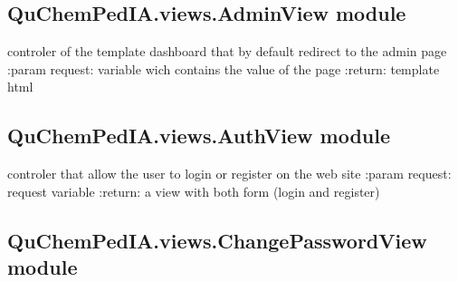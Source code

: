 \documentclass[letterpaper,10pt,english]{sphinxmanual}
\begin{document}
\subsection{QuChemPedIA.views.AdminView module}
\label{\detokenize{QuChemPedIA.views:module-QuChemPedIA.views.AdminView}}\label{\detokenize{QuChemPedIA.views:quchempedia-views-adminview-module}}

\begin{fulllineitems}
\label{\detokenize{QuChemPedIA.views:QuChemPedIA.views.AdminView.admin}}
controler of the template dashboard that by default redirect to the admin page
:param request: variable wich contains the value of the page
:return: template html

\end{fulllineitems}



\subsection{QuChemPedIA.views.AuthView module}
\label{\detokenize{QuChemPedIA.views:module-QuChemPedIA.views.AuthView}}\label{\detokenize{QuChemPedIA.views:quchempedia-views-authview-module}}

\begin{fulllineitems}
\label{\detokenize{QuChemPedIA.views:QuChemPedIA.views.AuthView.auth}}
controler that allow the user to login or register on the web site
:param request: request variable
:return: a view with both form (login and register)

\end{fulllineitems}



\subsection{QuChemPedIA.views.ChangePasswordView module}
\label{\detokenize{QuChemPedIA.views:module-QuChemPedIA.views.ChangePasswordView}}\label{\detokenize{QuChemPedIA.views:quchempedia-views-changepasswordview-module}}
\end{document}
